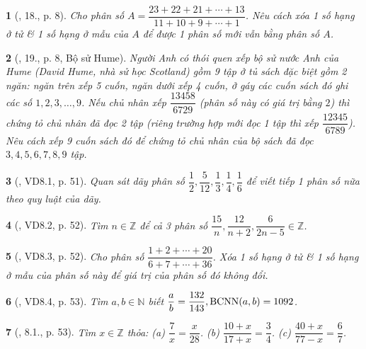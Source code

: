 \documentclass{article}
\newtheorem{baitoan}{}
\begin{document}
\begin{baitoan}[\cite{Binh_Toan_6_tap_2}, 18., p. 8]
	Cho phân số $A = \dfrac{23 + 22 + 21 + \cdots + 13}{11 + 10 + 9 + \cdots + 1}$. Nêu cách xóa 1 số hạng ở tử \& 1 số hạng ở mẫu của $A$ để được 1 phân số mới vẫn bằng phân số $A$.
\end{baitoan}

\begin{baitoan}[\cite{Binh_Toan_6_tap_2}, 19., p. 8, Bộ sử Hume]
	Người Anh có thói quen xếp bộ sử nước Anh của Hume (David Hume, nhà sử học Scotland) gồm 9 tập ở tủ sách đặc biệt gồm 2 ngăn: ngăn trên xếp 5 cuốn, ngăn dưới xếp 4 cuốn, ở gáy các cuốn sách đó ghi các số $1,2,3,\ldots,9$. Nếu chủ nhân xếp $\dfrac{13458}{6729}$ (phân số này có giá trị bằng $2$) thì chứng tỏ chủ nhân đã đọc 2 tập (riêng trường hợp mới đọc 1 tập thì xếp $\dfrac{12345}{6789}$). Nêu cách xếp 9 cuốn sách đó để chứng tỏ chủ nhân của bộ sách đã đọc $3,4,5,6,7,8,9$ tập.
\end{baitoan}

\begin{baitoan}[\cite{TLCT_THCS_Toan_6_so_hoc}, VD8.1, p. 51]
	Quan sát dãy phân số $\dfrac{1}{2},\dfrac{5}{12},\dfrac{1}{3},\dfrac{1}{4},\dfrac{1}{6}$ để viết tiếp 1 phân số nữa theo quy luật của dãy.
\end{baitoan}

\begin{baitoan}[\cite{TLCT_THCS_Toan_6_so_hoc}, VD8.2, p. 52]
	Tìm $n\in\mathbb{Z}$ để cả 3 phân số $\dfrac{15}{n},\dfrac{12}{n + 2},\dfrac{6}{2n - 5}\in\mathbb{Z}$.
\end{baitoan}

\begin{baitoan}[\cite{TLCT_THCS_Toan_6_so_hoc}, VD8.3, p. 52]
	Cho phân số $\dfrac{1 + 2 + \cdots + 20}{6 + 7 + \cdots + 36}$. Xóa 1 số hạng ở tử \& 1 số hạng ở mẫu của phân số này để giá trị của phân số đó không đổi.
\end{baitoan}

\begin{baitoan}[\cite{TLCT_THCS_Toan_6_so_hoc}, VD8.4, p. 53]
	Tìm $a,b\in\mathbb{N}$ biết $\dfrac{a}{b} = \dfrac{132}{143},{\rm BCNN}(a,b) = 1092$.
\end{baitoan}

\begin{baitoan}[\cite{TLCT_THCS_Toan_6_so_hoc}, 8.1., p. 53]
	Tìm $x\in\mathbb{Z}$ thỏa: (a) $\dfrac{7}{x} = \dfrac{x}{28}$. (b) $\dfrac{10 + x}{17 + x} = \dfrac{3}{4}$. (c) $\dfrac{40 + x}{77 - x} = \dfrac{6}{7}$.
\end{baitoan}
\end{document}
